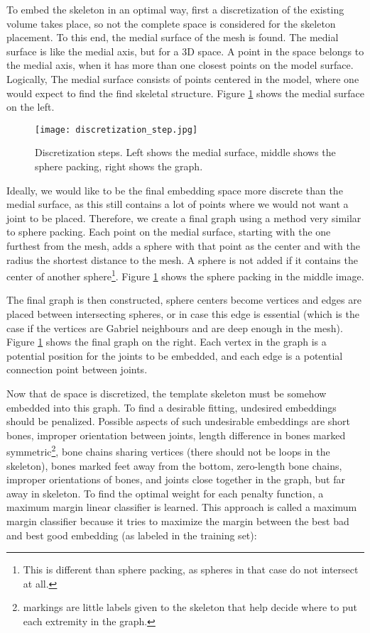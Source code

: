 \documentclass{article}
\begin{document}
To embed the skeleton in an optimal way, first a discretization of the
existing volume takes place, so not the complete space is considered for the
skeleton placement. To this end, the medial surface of the mesh is found. The
medial surface is like the medial axis, but for a 3D space. A point in the space
belongs to the medial axis, when it has more than one closest points on the
model surface. Logically, The medial surface consists of points centered in the model,
where one would expect to find the find skeletal structure. Figure
\ref{fig:discretization}
 shows the medial surface on the left.

\begin{figure}[h]
    \centering
    \texttt{[image: discretization\_step.jpg]}
    \caption{Discretization steps. Left shows the medial surface, middle shows
    the sphere packing, right shows the graph.}
    \label{fig:discretization}
\end{figure}

Ideally, we would like to be the final embedding space more discrete than the
medial surface, as this still contains a lot of points where we would not want a
joint to be placed. Therefore, we create a final graph using a method very
similar to sphere packing.
Each point on the medial surface, starting with the one furthest from the mesh,
adds a sphere with that point as the center and with the radius the shortest distance
to the mesh. A sphere is not added if it contains the center of another
sphere\footnote{This is different than sphere packing, as spheres in that case
do not intersect at all.}. Figure \ref{fig:discretization} shows the sphere
packing in the middle image.

The final graph is then constructed, sphere
centers become vertices and edges are placed between intersecting spheres, or
in case this edge is essential (which is the case if the vertices are Gabriel
neighbours and are deep enough in the mesh).
Figure \ref{fig:discretization} shows the final graph on the
right. Each vertex in the graph is a potential position for the joints to be
embedded, and each edge is a potential connection point between joints.

Now that de space is discretized, the template skeleton must be somehow embedded
into this graph. To find a desirable fitting, undesired embeddings should be penalized. Possible
aspects of such undesirable embeddings are short bones, improper orientation
between joints, length difference in bones marked symmetric\footnote{markings
are little labels given to the skeleton that help decide where to put each
extremity in the graph.}, bone chains
sharing vertices (there should not be loops in the skeleton), bones marked feet away from the
bottom, zero-length bone chains, improper
orientations of bones, and joints close together in the graph, but far away in
skeleton\citep{paper1}. To find the optimal weight for each penalty function, a
maximum margin linear classifier is learned. 
This approach is called a maximum margin classifier because it tries 
to maximize the margin between the best bad and best
good embedding (as labeled in the training set):
\end{document}
